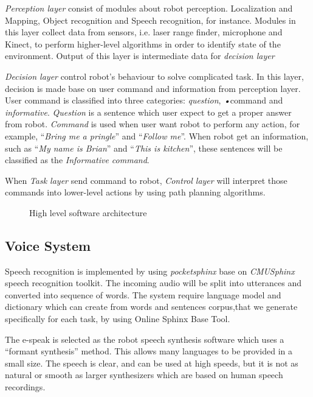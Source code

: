 \documentclass{llncs}
\newcommand{\dq}[1]{``#1''}
\begin{document}
\textit{Perception layer} consist of modules about robot perception. Localization and Mapping, Object recognition and Speech recognition, for instance. Modules in this layer collect data from sensors, i.e. laser range finder, microphone and Kinect, to perform higher-level algorithms in order to identify state of the environment. Output of this layer is intermediate data for \textit{decision layer}

\textit{Decision layer} control robot's behaviour to solve complicated task. In this layer, decision is made base on user command and information from perception layer. User command is classified into three categories: \textit{question}, \textit{•}{command} and \textit{informative}. \textit{Question} is a sentence which user expect to get a proper answer from robot. \textit{Command} is used when user want robot to perform any action, for example, \dq{\textit{Bring me a pringle}} and \dq{\textit{Follow me}}. When robot get an information, such as \dq{\textit{My name is Brian}} and \dq{\textit{This is kitchen}}, these sentences will be classified as the \textit{Informative command}.

When \textit{Task layer} send command to robot, \textit{Control layer} will interpret those commands into lower-level actions by using path planning algorithms.

\begin{figure}
\centering
\caption{High level software architecture}
\label{fig:soft_arc}
\end{figure}

\subsection{Voice System}

Speech recognition is implemented by using \textit{pocketsphinx} base on \textit{CMUSphinx} speech recognition toolkit. The incoming audio will be split into utterances and converted into sequence of words. The system require language model and dictionary which can create from words and sentences corpus,that we generate specifically for each task, by using Online Sphinx Base Tool.

The e-speak is selected as the robot speech synthesis software which uses a \dq{formant synthesis} method. This allows many languages to be provided in a small size. The speech is clear, and can be used at high speeds, but it is not as natural or smooth as larger synthesizers which are based on human speech recordings.
\end{document}
